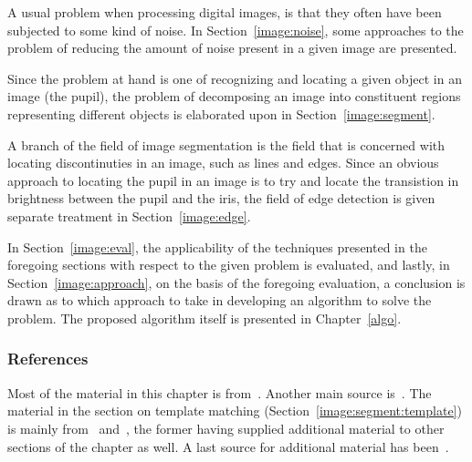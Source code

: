A usual problem when processing digital images, is that they often
have been subjected to some kind of noise.  In
Section~\ref{image:noise}, some approaches to the problem of reducing
the amount of noise present in a given image are presented.  

Since the problem at hand is one of recognizing and locating a given
object in an image (the pupil), the problem of decomposing an image
into constituent regions representing different objects is elaborated
upon in Section~\ref{image:segment}.  

A branch of the field of image segmentation is the field that is
concerned with locating discontinuties in an image, such as lines and
edges.  Since an obvious approach to locating the pupil in an image is
to try and locate the transistion in brightness between the pupil and
the iris, the field of edge detection is given separate treatment in
Section~\ref{image:edge}.  

In Section~\ref{image:eval}, the applicability of the techniques
presented in the foregoing sections with respect to the given problem
is evaluated, and lastly, in Section~\ref{image:approach}, on the
basis of the foregoing evaluation, a conclusion is drawn as to which
approach to take in developing an algorithm to solve the problem.  The
proposed algorithm itself is presented in Chapter~\ref{algo}.

\subsubsection{References}

Most of the material in this chapter is from~\cite{digim}.  Another
main source is~\cite{digpic}.  The material in the section on template
matching (Section~\ref{image:segment:template}) is mainly
from~\cite{digpat} and~\cite{template}, the former having supplied
additional material to other sections of the chapter as well.  A last
source for additional material has been~\cite{digbild}.
